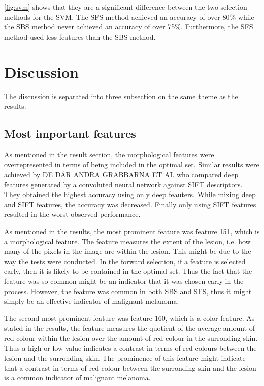 \documentclass{kththesis}
\begin{document}
\ref{fig:svm} shows that they are a significant difference between the two selection methods for the SVM. The SFS method achieved an accuracy of over 80\% while the SBS method never achieved an accuracy of over 75\%. Furthermore, the SFS method used less features than the SBS method.

\chapter{Discussion}

The discussion is separated into three subsection on the same theme as the results.

\section{Most important features}

As mentioned in the result section, the morphological features were overrepresented in terms of being included in the optimal set. Similar results were achieved by DE DÄR ANDRA GRABBARNA ET AL who compared deep features generated by a convoluted neural network against SIFT descriptors. They obtained the highest accuracy using only deep feauters. While mixing deep and SIFT features, the accuracy was decreased. Finally only using SIFT features resulted in the worst observed performance. 

As mentioned in the results, the most prominent feature was feature 151, which is a morphological feature. The feature measures the extent of the lesion, i.e. how many of the pixels in the image are within the lesion. This might be due to the way the tests were conducted. In the forward selection, if a feature is selected early, then it is likely to be contained in the optimal set. Thus the fact that the feature was so common might be an indicator that it was chosen early in the process. However, the feature was common in both SBS and SFS, thus it might simply be an effective indicator of malignant melanoma.

The second most prominent feature was feature 160, which is a color feature. As stated in the results, the feature measures the quotient of the average amount of red colour within the lesion over the amount of red colour in the surronding skin. Thus a high or low value indicates a contrast in terms of red colours between the lesion and the surronding skin. The prominence of this feature might indicate that a contrast in terms of red colour between the surronding skin and the lesion is a common indicator of malignant melanoma. %
\end{document}

